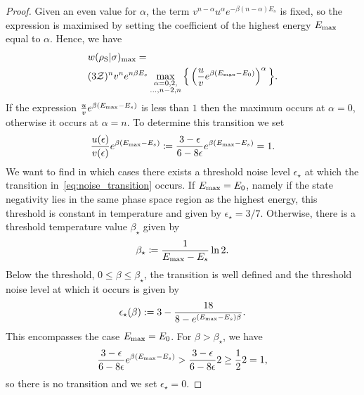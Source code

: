 \documentclass[pra,
aps,
twocolumn,
superscriptaddress,
groupedaddress,
nofootinbib,
reprint
]{revtex4-1}
\begin{document}
\begin{proof}
Given an even value for $\alpha$, the term $v^{n-\alpha} u^{\alpha} e^{-\beta (n-\alpha)E_s}$ is fixed, so the expression is maximised by setting the coefficient of the highest energy $E_{\rm{max}}$ equal to $\alpha$.
Hence, we have
\begin{align}
	&w(\rho_{\rm{S}} | \sigma)_{\rm{max}} = \nonumber\\
	&(3\mathcal{Z})^{n} v^n e^{n\beta E_s}\max\limits_{\substack{\alpha = 0,2, \\ \dots,n-2,n}}{\Big\{ \left( \frac{u}{v} e^{\beta (E_{\rm{max}} - E_0)} \right)^{\alpha} \Big\}}.
\end{align}
If the expression $\frac{u}{v} e^{\beta (E_{\rm{max}} - E_s)}$ is less than $1$ then the maximum occurs at $\alpha=0$, otherwise it occurs at $\alpha = n$. 
To determine this transition we set
\begin{equation}\label{eq:noise_transition}
	\frac{u(\epsilon)}{v(\epsilon)} e^{\beta (E_{\rm{max}} - E_s)} \coloneqq \frac{3-\epsilon}{6-8\epsilon} e^{\beta (E_{\rm{max}} - E_s)} = 1.
\end{equation}
We want to find in which cases there exists a threshold noise level $\epsilon_\star$ at which the transition in~\cref{eq:noise_transition} occurs.
If $E_{\rm{max}} = E_0$, namely if the state negativity lies in the same phase space region as the highest energy, this threshold is constant in temperature and given by $\epsilon_{\star} = 3/7$. 
Otherwise, there is a threshold temperature value $\beta_\star$ given by
\begin{equation}
	\beta_{\star} \coloneqq \frac{1}{E_{\rm{max}} - E_s} \ln2.
\end{equation}
Below the threshold, $0 \leq \beta \leq \beta_\star$, the transition is well defined and the threshold noise level at which it occurs is given by
\begin{equation}
	\epsilon_{\star}(\beta) := 3 - \dfrac{18}{8-e^{(E_{\rm{max}} - E_s)\beta}}.
\end{equation}
This encompasses the case $E_{\rm{max}} = E_0$.
For $\beta > \beta_\star$, we have
\begin{equation*}
	\frac{3-\epsilon}{6-8\epsilon} e^{\beta (E_{\rm{max}} - E_s)} > \frac{3-\epsilon}{6-8\epsilon} 2 \geq \frac{1}{2}2 = 1,
\end{equation*}
so there is no transition and we set $\epsilon_\star = 0$.


\end{proof}
\end{document}
